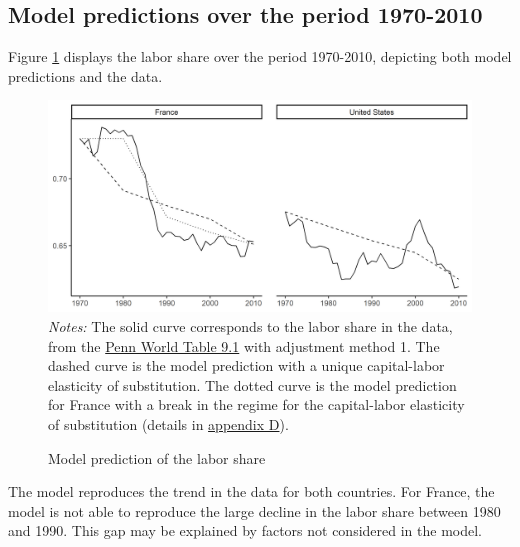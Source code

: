 \subsection{Model predictions over the period 1970-2010}\label{subsec:model_pred}

Figure \ref{fig:baseline7010} displays the labor share over the period 1970-2010, depicting both model predictions and the data.
\begin{figure}[tb]
	\centering
	\caption{Model prediction of the labor share} \label{fig:baseline7010}
	\includegraphics[width=1\linewidth]{../result/baseline7010.png}
	\vspace{-6ex}
	\justify\singlespacing\footnotesize \textit{Notes:} The solid curve corresponds to the labor share in the data, from the \href{https://www.rug.nl/ggdc/productivity/pwt/}{Penn World Table 9.1} with adjustment method 1. The dashed curve is the model prediction with a unique capital-labor elasticity of substitution. The dotted curve is the model prediction for France with a break in the regime for the capital-labor elasticity of substitution (details in \hyperref[appendix:regime]{appendix D}).
\end{figure}
The model reproduces the trend in the data for both countries. For France, the model is not able to reproduce the large decline in the labor share between 1980 and 1990. This gap may be explained by factors not considered in the model.
